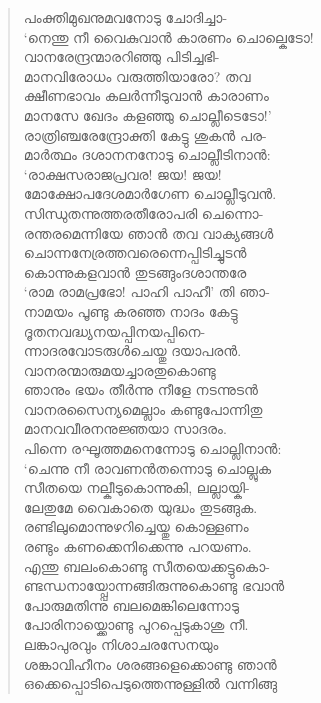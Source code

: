 \begin{verse}
പംക്തിമുഖനുമവനോടു ചോദിച്ചാ-\\
‘നെന്തു നീ വൈകുവാന്‍ കാരണം ചൊല്കെടോ!\\
വാനരേന്ദ്രന്മാരറിഞ്ഞു പിടിച്ചഭി-\\
മാനവിരോധം വരുത്തിയാരോ? തവ\\
ക്ഷീണഭാവം കലര്‍ന്നീടുവാന്‍ കാരാണം\\
മാനസേ ഖേദം കളഞ്ഞു ചൊല്ലീടെടോ!’\\
രാത്രിഞ്ചരേന്ദ്രോക്തി കേട്ടു ശുകന്‍ പര-\\
മാര്‍ത്ഥം ദശാനനനോടു ചൊല്ലീടിനാന്‍:\\
‘രാക്ഷസരാജപ്രവര! ജയ! ജയ!\\
മോക്ഷോപദേശമാര്‍ഗേണ ചൊല്ലീടുവന്‍.\\
സിന്ധുതന്നുത്തരതീരോപരി ചെന്നൊ-\\
രന്തരമെന്നിയേ ഞാന്‍ തവ വാക്യങ്ങള്‍\\
ചൊന്നനേര്രത്തവരെന്നെപ്പിടിച്ചുടന്‍\\
കൊന്നുകളവാന്‍ തുടങ്ങുംദശാന്തരേ\\
‘രാമ രാമപ്രഭോ! പാഹി പാഹീ’ തി ഞാ-\\
നാമയം പൂണ്ടു കരഞ്ഞ നാദം കേട്ടു\\
ദൂതനവദ്ധ്യനയപ്പിനയപ്പിനെ-\\
ന്നാദരവോടരുള്‍ചെയ്തു ദയാപരന്‍.\\
വാനരന്മാരുമയച്ചാരതുകൊണ്ടു\\
ഞാനും ഭയം തീര്‍ന്നു നീളേ നടന്നുടന്‍\\
വാനരസൈന്യമെല്ലാം കണ്ടുപോന്നിതു\\
മാനവവീരനനുജ്ഞയാ സാദരം.\\
പിന്നെ രഘൂത്തമനെന്നോടു ചൊല്ലിനാന്‍:\\
‘ചെന്നു നീ രാവണന്‍തന്നൊടു ചൊല്ലുക\\
സീതയെ നല്കീടുകൊന്നുകി, ലല്ലായ്കി-\\
ലേതുമേ വൈകാതെ യുദ്ധം തുടങ്ങുക.\\
രണ്ടിലുമൊന്നുഴറിച്ചെയ്തു കൊള്ളണം\\
രണ്ടും കണക്കെനിക്കെന്നു പറയണം.\\
എന്തു ബലംകൊണ്ടു സീതയെക്കട്ടുകൊ-\\
ണ്ടന്ധനായ്പ്പോന്നങ്ങിരുന്നുകൊണ്ടു ഭവാന്‍\\
പോരുമതിന്നു ബലമെങ്കിലെന്നോടു\\
പോരിനായ്ക്കൊണ്ടു പുറപ്പെടുകാശു നീ.\\
ലങ്കാപുരവും നിശാചരസേനയും\\
ശങ്കാവിഹീനം ശരങ്ങളെക്കൊണ്ടു ഞാന്‍\\
ഒക്കെപ്പൊടിപെടുത്തെന്നുള്ളില്‍ വന്നിങ്ങു\\

\end{verse}
